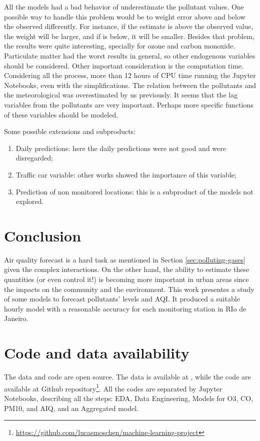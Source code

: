 All the models had a bad behavior of underestimate the pollutant values. One
possible way to handle this problem would be to weight error above and below
the observed differently. For instance, if the estimate is above the observed
value, the weight will be larger, and if is below, it will be smaller. Besides
that problem, the results were quite interesting, specially for ozone and
carbon monoxide. Particulate matter had the worst results in general, so other
endogenous variables should be considered. Other important consideration is
the computation time. Considering all the process, more than 12 hours of CPU
time running the Jupyter Notebooks, even with the simplifications. The
relation between the pollutants and the meteorological was overestimated by us
previously. It seems that the lag variables from the pollutants are very
important. Perhaps more specific functions of these variables should be
modeled. 

Some possible extensions and subproducts: 

\begin{enumerate}
    \item Daily predictions: here the daily predictions were not good and were
    disregarded; 
    \item Traffic car variable: other works showed the importance of this
    variable; 
    \item Prediction of non monitored locations: this is a subproduct of the
    models not explored. 
\end{enumerate}

\section{Conclusion}
\label{sec:conclusion}

Air quality forecast is a hard task as mentioned in Section
\ref{sec:polluting-gases} given the complex interactions. On the other hand,
the ability to estimate these quantities (or even control it!) is becoming
more important in urban areas since the impacts on the community and the
environment. This work presentes a study of some models to forecast
pollutants' levels and AQI. It produced a suitable hourly model with a
reasonable accuracy for each monitoring station in RIo de Janeiro.

\section{Code and data availability}

The data and code are open source. The data is available at
\cite{dataset-rio-ar-quality}, while the code are available at Github
repository\footnote{\url{https://github.com/lucasmoschen/machine-learning-project}}.
All the codes are separated by Jupyter Notebooks, describing all the steps:
EDA, Data Engineering, Models for O3, CO, PM10, and AIQ, and an Aggregated
model. 